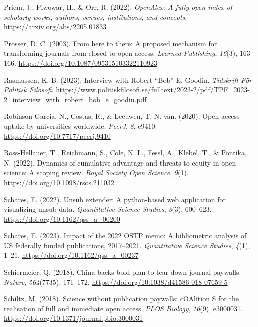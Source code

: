 \documentclass[a4paper,man,floatsintext,longtable,noextraspace,12pt]{apa6}
\newenvironment{CSLReferences}%
  {}%
  {\par}
\begin{document}
\begin{CSLReferences}{1}{0}
\leavevmode{}%
Priem, J., Piwowar, H., \& Orr, R. (2022). \emph{OpenAlex: A fully-open
index of scholarly works, authors, venues, institutions, and concepts}.
\url{https://arxiv.org/abs/2205.01833}

\leavevmode{}%
Prosser, D. C. (2003). From here to there: A proposed mechanism for
transforming journals from closed to open access. \emph{Learned
Publishing}, \emph{16}(3), 163--166.
\url{https://doi.org/10.1087/095315103322110923}

\leavevmode{}%
Rasmussen, K. B. (2023). Interview with {Robert {``Bob''} E. Goodin}.
\emph{Tidskrift För Politisk Filosofi}.
\url{https://www.politiskfilosofi.se/fulltext/2023-2/pdf/TPF_2023-2_interview_with_robert_bob_e_goodin.pdf}

\leavevmode{}%
Robinson-Garcia, N., Costas, R., \& Leeuwen, T. N. van. (2020). Open
access uptake by universities worldwide. \emph{{PeerJ}}, \emph{8},
e9410. \url{https://doi.org/10.7717/peerj.9410}

\leavevmode{}%
Ross-Hellauer, T., Reichmann, S., Cole, N. L., Fessl, A., Klebel, T., \&
Pontika, N. (2022). Dynamics of cumulative advantage and threats to
equity in open science: A scoping review. \emph{Royal Society Open
Science}, \emph{9}(1). \url{https://doi.org/10.1098/rsos.211032}

\leavevmode{}%
Schares, E. (2022). Unsub extender: A python-based web application for
visualizing unsub data. \emph{Quantitative Science Studies},
\emph{3}(3), 600--623. \url{https://doi.org/10.1162/qss_a_00200}

\leavevmode{}%
Schares, E. (2023). Impact of the 2022 OSTP memo: A bibliometric
analysis of US federally funded publications, 2017--2021.
\emph{Quantitative Science Studies}, \emph{4}(1), 1--21.
\url{https://doi.org/10.1162/qss_a_00237}

\leavevmode{}%
Schiermeier, Q. (2018). China backs bold plan to tear down journal
paywalls. \emph{Nature}, \emph{564}(7735), 171--172.
\url{https://doi.org/10.1038/d41586-018-07659-5}

\leavevmode{}%
Schiltz, M. (2018). Science without publication paywalls: {cOAlition S}
for the realisation of full and immediate open access. \emph{PLOS
Biology}, \emph{16}(9), e3000031.
\url{https://doi.org/10.1371/journal.pbio.3000031}


\end{CSLReferences}
\end{document}
